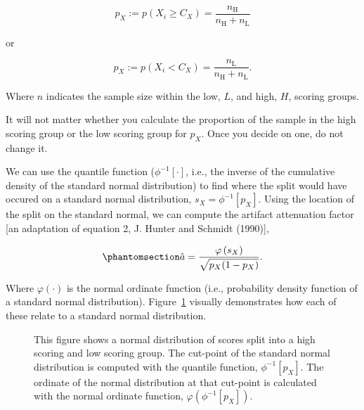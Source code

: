 \documentclass[
  letterpaper,
  DIV=11,
  numbers=noendperiod]{scrreprt}
\begin{document}
\[
p_X  := p(X_i \geq C_X) = \frac{ n_{\text{H}} }{n_{\text{H}} + n_{\text{L}}}
\]

or

\[
p_X := p(X_i < C_X) = \frac{ n_{\text{L}} }{n_{\text{H}} + n_{\text{L}}}.
\]

Where \(n\) indicates the sample size within the low, \(L\), and high,
\(H\), scoring groups.

\begin{tcolorbox}[enhanced jigsaw, opacityback=0, coltitle=black, toprule=.15mm, colframe=quarto-callout-tip-color-frame, bottomtitle=1mm, rightrule=.15mm, colbacktitle=quarto-callout-tip-color!10!white, left=2mm, bottomrule=.15mm, breakable, title={Note}, colback=white, opacitybacktitle=0.6, titlerule=0mm, arc=.35mm, leftrule=.75mm, toptitle=1mm]

It will not matter whether you calculate the proportion of the sample in
the high scoring group or the low scoring group for \(p_X\). Once you
decide on one, do not change it.

\end{tcolorbox}

We can use the quantile function (\(\phi^{-1}[\cdot]\), i.e., the
inverse of the cumulative density of the standard normal distribution)
to find where the split would have occured on a standard normal
distribution, \(s_X=\phi^{-1}[p_X]\). Using the location of the split on
the standard normal, we can compute the artifact attenuation factor
{[}an adaptation of equation 2, J. Hunter and Schmidt (1990){]},

\begin{equation}\phantomsection\label{eq-artifact-factor-dich}{
\hat{a} =\frac{\varphi\left(s_X\right)}{\sqrt{p_X(1-p_X)}}.
}\end{equation}

Where \(\varphi(\cdot)\) is the normal ordinate function (i.e.,
probability density function of a standard normal distribution).
Figure~\ref{fig-normal-density} visually demonstrates how each of these
relate to a standard normal distribution.

\begin{figure}[H]


\caption{\label{fig-normal-density}This figure shows a normal
distribution of scores split into a high scoring and low scoring group.
The cut-point of the standard normal distribution is computed with the
quantile function, \(\phi^{-1}[p_X]\). The ordinate of the normal
distribution at that cut-point is calculated with the normal ordinate
function, \(\varphi\left(\phi^{-1}[p_X]\right)\).}

\end{figure}%
\end{document}
